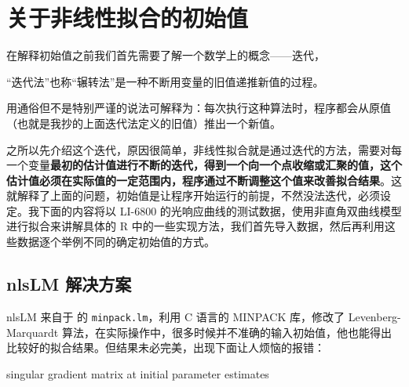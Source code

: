 \documentclass[
]{krantz}
\makeatletter
\newenvironment{Shaded}{\begin{snugshade}}{\end{snugshade}}
\newcommand{\CommentTok}[1]{\textcolor[rgb]{0.56,0.35,0.01}{\textit{#1}}}
\newcommand{\FunctionTok}[1]{\textcolor[rgb]{0.00,0.00,0.00}{#1}}
\newcommand{\NormalTok}[1]{#1}
\newcommand{\OtherTok}[1]{\textcolor[rgb]{0.56,0.35,0.01}{#1}}
\newcommand{\SpecialCharTok}[1]{\textcolor[rgb]{0.00,0.00,0.00}{#1}}
\newcommand{\StringTok}[1]{\textcolor[rgb]{0.31,0.60,0.02}{#1}}
\renewenvironment{quote}{\begin{VF}}{\end{VF}}
\newenvironment{kframe}{%
\medskip{}
\setlength{\fboxsep}{.8em}
 \def\at@end@of@kframe{}%
 \ifinner\ifhmode%
  \def\at@end@of@kframe{\end{minipage}}%
  \begin{minipage}{\columnwidth}%
 \fi\fi%
 \def\FrameCommand##1{\hskip\@totalleftmargin \hskip-\fboxsep
 \colorbox{shadecolor}{##1}\hskip-\fboxsep
     \hskip-\linewidth \hskip-\@totalleftmargin \hskip\columnwidth}%
 \MakeFramed {\advance\hsize-\width
   \@totalleftmargin\z@ \linewidth\hsize
   \@setminipage}}%
 {\par\unskip\endMakeFramed%
 \at@end@of@kframe}
\renewenvironment{Shaded}{\begin{kframe}}{\end{kframe}}
\makeatother
\begin{document}
\cleardoublepage

\hypertarget{start_con}{%
\chapter{关于非线性拟合的初始值}\label{start_con}}

在解释初始值之前我们首先需要了解一个数学上的概念------迭代，

\begin{quote}
``迭代法''也称``辗转法''是一种不断用变量的旧值递推新值的过程。
\end{quote}

用通俗但不是特别严谨的说法可解释为：每次执行这种算法时，程序都会从原值（也就是我抄的上面迭代法定义的旧值）推出一个新值。

之所以先介绍这个迭代，原因很简单，非线性拟合就是通过迭代的方法，需要对每一个变量\textbf{最初的估计值进行不断的迭代，得到一个向一个点收缩或汇聚的值，这个估计值必须在实际值的一定范围内，程序通过不断调整这个值来改善拟合结果}。这就解释了上面的问题，初始值是让程序开始运行的前提，不然没法迭代，必须设定。我下面的内容将以 LI-6800 的光响应曲线的测试数据，使用非直角双曲线模型进行拟合来讲解具体的 R 中的一些实现方法，我们首先导入数据，然后再利用这些数据逐个举例不同的确定初始值的方式。

\begin{Shaded}
\end{Shaded}

\hypertarget{nlslm}{%
\section{nlsLM 解决方案}\label{nlslm}}

nlsLM 来自于 \citet{Elzhov2016minpack} 的 \texttt{minpack.lm}，利用 C 语言的 MINPACK 库，修改了 Levenberg-Marquardt 算法，在实际操作中，很多时候并不准确的输入初始值，他也能得出比较好的拟合结果。但结果未必完美，出现下面让人烦恼的报错：

\begin{quote}
singular gradient matrix at initial parameter estimates
\end{quote}
\end{document}
